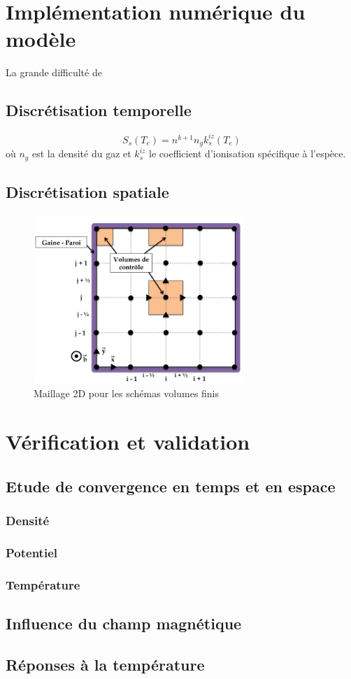 \section{Implémentation numérique du modèle}
La grande difficulté de 

\subsection{Discrétisation temporelle}

\begin{equation}
S_s(T_e)=n^{k+1}n_gk_{s}^{iz}(T_e)
\end{equation}
où $n_g$ est la densité du gaz et $k_{s}^{iz}$ le coefficient d'ionisation spécifique à l'espèce.

\subsection{Discrétisation spatiale}
\begin{figure}[htbp]
\centering
\includegraphics[height=64mm,width=80mm]{figures/grid.png}
{\caption{Maillage 2D pour les schémas volumes finis}
\label{maillage}}
\end{figure}

\section{Vérification et validation}

\subsection{Etude de convergence en temps et en espace}
\subsubsection{Densité}
\subsubsection{Potentiel}
\subsubsection{Température}
\subsection{Influence du champ magnétique}
\subsection{Réponses à la température}
